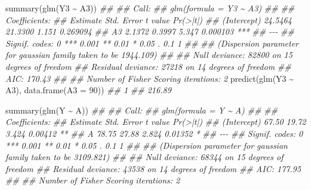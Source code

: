 \documentclass[
  10pt,
  a4paper,
]{book}
\newenvironment{Shaded}{\begin{snugshade}}{\end{snugshade}}
\newcommand{\AttributeTok}[1]{\textcolor[rgb]{0.40,0.45,0.13}{#1}}
\newcommand{\DecValTok}[1]{\textcolor[rgb]{0.68,0.00,0.00}{#1}}
\newcommand{\DocumentationTok}[1]{\textcolor[rgb]{0.37,0.37,0.37}{\textit{#1}}}
\newcommand{\FunctionTok}[1]{\textcolor[rgb]{0.28,0.35,0.67}{#1}}
\newcommand{\NormalTok}[1]{\textcolor[rgb]{0.00,0.46,0.62}{#1}}
\newcommand{\SpecialCharTok}[1]{\textcolor[rgb]{0.37,0.37,0.37}{#1}}
\begin{document}
\begin{Shaded}
\begin{Highlighting}[]

\FunctionTok{summary}\NormalTok{(}\FunctionTok{glm}\NormalTok{(Y3 }\SpecialCharTok{\textasciitilde{}}\NormalTok{ A3))}
\DocumentationTok{\#\# }
\DocumentationTok{\#\# Call:}
\DocumentationTok{\#\# glm(formula = Y3 \textasciitilde{} A3)}
\DocumentationTok{\#\# }
\DocumentationTok{\#\# Coefficients:}
\DocumentationTok{\#\#             Estimate Std. Error t value Pr(\textgreater{}|t|)    }
\DocumentationTok{\#\# (Intercept)  24.5464    21.3300   1.151 0.269094    }
\DocumentationTok{\#\# A3            2.1372     0.3997   5.347 0.000103 ***}
\DocumentationTok{\#\# {-}{-}{-}}
\DocumentationTok{\#\# Signif. codes:  0 \textquotesingle{}***\textquotesingle{} 0.001 \textquotesingle{}**\textquotesingle{} 0.01 \textquotesingle{}*\textquotesingle{} 0.05 \textquotesingle{}.\textquotesingle{} 0.1 \textquotesingle{} \textquotesingle{} 1}
\DocumentationTok{\#\# }
\DocumentationTok{\#\# (Dispersion parameter for gaussian family taken to be 1944.109)}
\DocumentationTok{\#\# }
\DocumentationTok{\#\#     Null deviance: 82800  on 15  degrees of freedom}
\DocumentationTok{\#\# Residual deviance: 27218  on 14  degrees of freedom}
\DocumentationTok{\#\# AIC: 170.43}
\DocumentationTok{\#\# }
\DocumentationTok{\#\# Number of Fisher Scoring iterations: 2}
\FunctionTok{predict}\NormalTok{(}\FunctionTok{glm}\NormalTok{(Y3 }\SpecialCharTok{\textasciitilde{}}\NormalTok{ A3), }\FunctionTok{data.frame}\NormalTok{(}\AttributeTok{A3 =} \DecValTok{90}\NormalTok{))}
\DocumentationTok{\#\#      1 }
\DocumentationTok{\#\# 216.89}

\FunctionTok{summary}\NormalTok{(}\FunctionTok{glm}\NormalTok{(Y }\SpecialCharTok{\textasciitilde{}}\NormalTok{ A))}
\DocumentationTok{\#\# }
\DocumentationTok{\#\# Call:}
\DocumentationTok{\#\# glm(formula = Y \textasciitilde{} A)}
\DocumentationTok{\#\# }
\DocumentationTok{\#\# Coefficients:}
\DocumentationTok{\#\#             Estimate Std. Error t value Pr(\textgreater{}|t|)   }
\DocumentationTok{\#\# (Intercept)    67.50      19.72   3.424  0.00412 **}
\DocumentationTok{\#\# A              78.75      27.88   2.824  0.01352 * }
\DocumentationTok{\#\# {-}{-}{-}}
\DocumentationTok{\#\# Signif. codes:  0 \textquotesingle{}***\textquotesingle{} 0.001 \textquotesingle{}**\textquotesingle{} 0.01 \textquotesingle{}*\textquotesingle{} 0.05 \textquotesingle{}.\textquotesingle{} 0.1 \textquotesingle{} \textquotesingle{} 1}
\DocumentationTok{\#\# }
\DocumentationTok{\#\# (Dispersion parameter for gaussian family taken to be 3109.821)}
\DocumentationTok{\#\# }
\DocumentationTok{\#\#     Null deviance: 68344  on 15  degrees of freedom}
\DocumentationTok{\#\# Residual deviance: 43538  on 14  degrees of freedom}
\DocumentationTok{\#\# AIC: 177.95}
\DocumentationTok{\#\# }
\DocumentationTok{\#\# Number of Fisher Scoring iterations: 2}
\end{Highlighting}
\end{Shaded}
\end{document}
